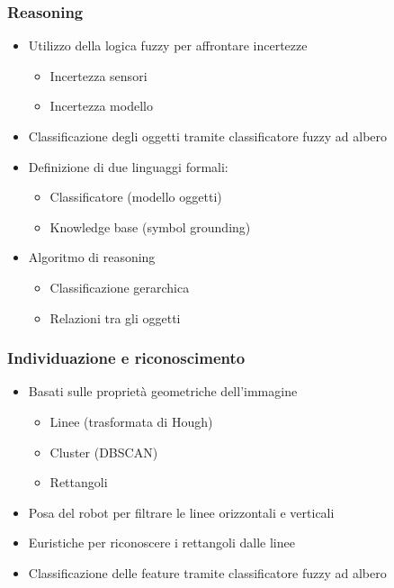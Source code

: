 \documentclass[c]{beamer}
\begin{document}

\begin{frame}
\frametitle{Reasoning}

\begin{itemize}
\item Utilizzo della logica fuzzy per affrontare incertezze
 \begin{itemize}
  \item Incertezza sensori
  \item Incertezza modello
 \end{itemize}
\item Classificazione degli oggetti tramite classificatore fuzzy ad albero

\item Definizione di due linguaggi formali:
 \begin{itemize}
  \item Classificatore (modello oggetti)
  \item Knowledge base (symbol grounding)
 \end{itemize}

\item Algoritmo di reasoning
 \begin{itemize}
  \item Classificazione gerarchica
  \item Relazioni tra gli oggetti
 \end{itemize}
\end{itemize}



\end{frame}


\begin{frame}
\frametitle{Individuazione e riconoscimento}
\begin{itemize}
 \item Basati sulle proprietà geometriche dell'immagine
 \begin{itemize}
  \item Linee (trasformata di Hough)
  \item Cluster (DBSCAN)
  \item Rettangoli
 \end{itemize}
 \item Posa del robot per filtrare le linee orizzontali e verticali
 \item Euristiche per riconoscere i rettangoli dalle linee
 \item Classificazione delle feature tramite classificatore fuzzy ad albero
\end{itemize}

\end{frame}
\end{document}
